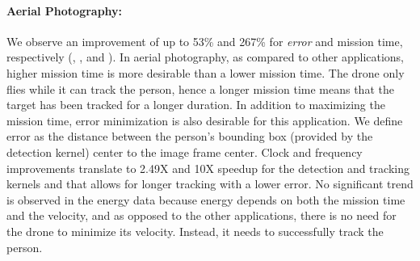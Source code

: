 \paragraph{Aerial Photography:} We observe an improvement of up to 53\% and 267\% for \emph{error} and mission time, respectively (, , and  ). In aerial photography, as compared to other applications, higher mission time is more desirable than a lower mission time. The drone only flies while it can track the person, hence a longer mission time means that the target has been tracked for a longer duration. In addition to maximizing the mission time, error minimization is also desirable for this application. We define error as the distance between the person's bounding box (provided by the detection kernel) center to the image frame center.  Clock and frequency improvements translate to 2.49X and 10X speedup for the detection and tracking kernels and that allows for longer tracking with a lower error. No significant trend is observed in the energy data because energy depends on both the mission time and the velocity, and as opposed to the other applications, there is no need for the drone to minimize its velocity. Instead, it needs to successfully track the person.


